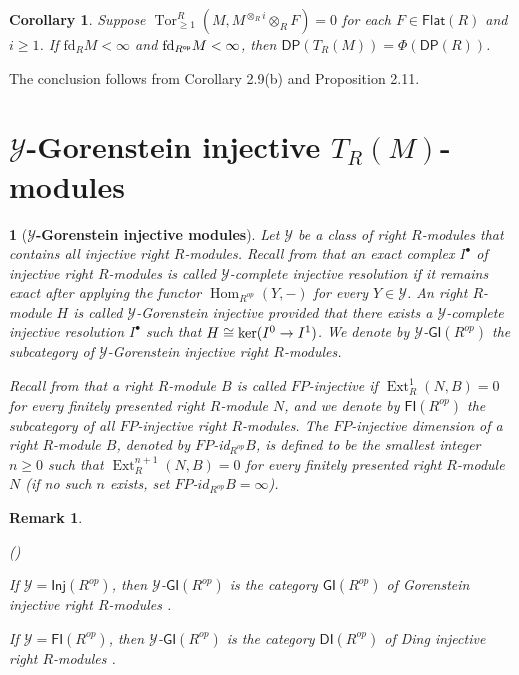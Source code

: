 \documentclass[10pt,twoside]{amsart}
\theoremstyle{bfupright head,slanted body}
\theoremstyle{bfupright head,upright body}
\newtheorem{bfhpg}[res]{}               \newtheorem*{bfhpg*}{}
\theoremstyle{fixed bf head,slanted body}
\newtheorem{cor}[res]{Corollary}        \newtheorem*{cor*}{Corollary}
\theoremstyle{fixed bf head,upright body}
\newtheorem{rmk}[res]{Remark}           \newtheorem*{rmk*}{Remark}
\theoremstyle{numbered paragraph}
\newlength{\thmlistleft}        %
\newlength{\thmlistright}       %
\newlength{\thmlistpartopsep}   %
\newlength{\thmlisttopsep}      %
\newlength{\thmlistparsep}      %
\newlength{\thmlistitemsep}     %
\newcounter{prt}
\newenvironment{prt}{\begin{list}{\upshape (\alph{prt})}%
    {\usecounter{prt}%
      \setlength{\leftmargin}{\thmlistleft}%
      \setlength{\labelwidth}{\thmlistleft}%
      \setlength{\rightmargin}{\thmlistright}%
      \setlength{\partopsep}{\thmlistpartopsep}%
      \setlength{\topsep}{\thmlisttopsep}%
      \setlength{\parsep}{\thmlistparsep}%
      \setlength{\itemsep}{\thmlistitemsep}}}%
  {\end{list}}%
\newenvironment{prf*}[1][Proof]{%
  \begin{proof}[\bf #1]
    \setcounter{equation}{0}
    \renewcommand{\theequation}{\arabic{equation}}}
  {\end{proof}
}
\numberwithin{equation}{res}
\newcommand{\DP}{\mathsf{DP}}
\newcommand{\DI}{\mathsf{DI}}
\newcommand{\GI}{\mathsf{GI}}
\newcommand{\fd}{\mathrm{fd}}
\newcommand{\Inj}{\mathsf{Inj}}
\newcommand{\Flat}{\mathsf{Flat}}
\newcommand{\FI}{\mathsf{FI}}
\newcommand{\Rop}{R^{\sf op}}
\newcommand{\kernel}{\mbox{\rm ker}}
\newcommand{\Hom}{\operatorname{Hom}}
\newcommand{\Ext}{\operatorname{Ext}}
\newcommand{\Tor}{\operatorname{Tor}}
\begin{document}
\begin{cor} \label{example of admissible and compatible}
Suppose $\Tor_{\geqslant 1}^R(M, M^{\otimes_Ri}\otimes_R F)=0$
for each $F\in \Flat(R)$ and $i \geqslant 1$.
If $\fd_RM<\infty$ and $\fd_{\Rop}M<\infty$,
then $\DP(T_R(M)) = \Phi(\DP(R))$.
\end{cor}

\begin{prf*}
The conclusion follows from Corollary 2.9(b) and Proposition 2.11.
\end{prf*}





\section{$\mathcal{Y}$-Gorenstein injective $T_R(M)$-modules}
\label{}%
\noindent


\begin{bfhpg}[\bf $\mathcal{Y}$-Gorenstein injective modules]
\label{}
Let $\mathcal{Y}$ be a class of right $R$-modules that contains all injective right $R$-modules.
Recall from \cite{GI} that
an exact complex $I^\bullet$ of injective right $R$-modules is called {\it $\mathcal{Y}$-complete injective resolution} if it remains exact after applying
the functor $\Hom_{R^{op}}(Y, -)$ for every $Y\in \mathcal{Y}$.
An right $R$-module $H$ is called \emph{$\mathcal{Y}$-Gorenstein injective}
provided that there exists a $\mathcal{Y}$-complete injective resolution $I^\bullet$
such that $H \cong \kernel(I^0 \to I^1)$. 
We denote by $\mathcal{Y}$-$\GI(R^{op})$ the subcategory of $\mathcal{Y}$-Gorenstein injective right $R$-modules.

Recall from \cite{S} that a right $R$-module $B$ is called $FP$-injective if $\Ext^{1}_{R}(N, B) = 0$ for every
finitely presented right $R$-module $N$, and
we denote by $\FI(R^{op})$ the subcategory of all $FP$-injective right $R$-modules. 
The $FP$-injective dimension of a right $R$-module $B$, denoted by $FP$-id$_{R^{op}}B$, is defined to be the smallest integer $n\geqslant 0$ such
that $\Ext^{n+1}_{R}(N, B) = 0$ for every finitely presented right $R$-module $N$ (if no such $n$
exists, set $FP$-$id_{R^{op}}B=\infty$).
\end{bfhpg}

\begin{rmk}
\begin{prt}
\item [(1)]If $\mathcal{Y}=\Inj(R^{op})$, then $\mathcal{Y}$-$\GI(R^{op})$ is the category $\GI(R^{op})$ of Gorenstein injective right $R$-modules \cite{GHD}.
\item[(2)] If $\mathcal{Y}=\FI(R^{op})$, then $\mathcal{Y}$-$\GI(R^{op})$ is the category $\DI(R^{op})$ of Ding injective right $R$-modules \cite{DLM, G}.
\end{prt}
\end{rmk}
\end{document}
